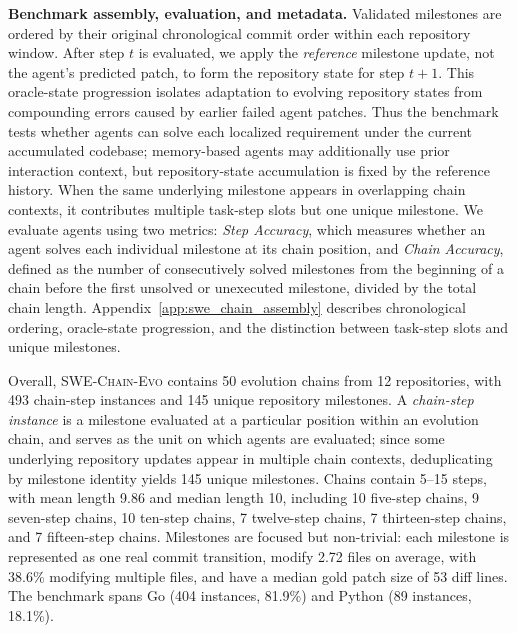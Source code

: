 \documentclass{llmxive}
\begin{document}
\textbf{Benchmark assembly, evaluation, and metadata.} \noindent
Validated milestones are ordered by their original chronological commit order within each repository window. After step $t$ is evaluated, we apply the \emph{reference} milestone update, not the agent's predicted patch, to form the repository state for step $t+1$. This oracle-state progression isolates adaptation to evolving repository states from compounding errors caused by earlier failed agent patches. 
Thus the benchmark tests whether agents can solve each localized requirement under the current accumulated codebase; memory-based agents may additionally use prior interaction context, but repository-state accumulation is fixed by the reference history.
When the same underlying milestone appears in overlapping chain contexts, it contributes multiple task-step slots but one unique milestone. 
We evaluate agents using two metrics: \emph{Step Accuracy}, which measures whether an agent solves each individual milestone at its chain position, and \emph{Chain Accuracy}, defined as the number of consecutively solved milestones from the beginning of a chain before the first unsolved or unexecuted milestone, divided by the total chain length.
Appendix~\ref{app:swe_chain_assembly} describes chronological ordering, oracle-state progression, and the distinction between task-step slots and unique milestones.



Overall, \textsc{SWE-Chain-Evo} contains 50 evolution chains from 12 repositories, with 493 chain-step instances and 145 unique repository milestones. A
\emph{chain-step instance} is a milestone evaluated at a particular position within an evolution chain, and serves as the unit on which agents are evaluated;
since some underlying repository updates appear in multiple chain contexts, deduplicating by milestone identity yields 145 unique milestones. Chains contain
5--15 steps, with mean length 9.86 and median length 10, including 10 five-step chains, 9 seven-step chains, 10 ten-step chains, 7 twelve-step chains, 7
thirteen-step chains, and 7 fifteen-step chains. Milestones are focused but non-trivial: each milestone is represented as one real commit transition, modify 2.72
files on average, with 38.6\% modifying multiple files, and have a median gold patch size of 53 diff lines. The benchmark spans Go (404 instances, 81.9\%) and
Python (89 instances, 18.1\%).
\end{document}
